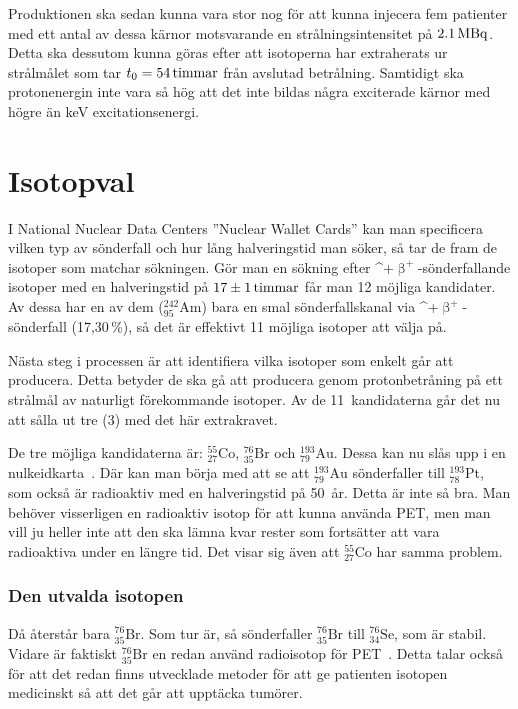 \documentclass[11pt,a4paper, german, english, swedish
]{article}
\newcommand{\BP}{\ifmmode\upbeta^{+}\else$\upbeta^{+}$\fi}
\begin{document}
Produktionen ska sedan kunna vara stor nog för att kunna injecera fem patienter med ett antal av dessa kärnor motsvarande en strålningsintensitet på $\unit[2.1]{MBq}$. Detta ska dessutom kunna göras efter att isotoperna har extraherats ur strålmålet som tar $t_0=\unit[54]{timmar}$ från avslutad betrålning. Samtidigt ska protonenergin inte vara så hög att det inte bildas några exciterade kärnor med högre än \unit[200]{keV} excitationsenergi. 



\section{Isotopval}
I National Nuclear Data Centers ''Nuclear Wallet Cards''\cite{NNDC_wallet} kan man specificera vilken typ av sönderfall och hur lång halveringstid man söker, så tar de fram de isotoper som matchar sökningen. Gör man en sökning efter \BP-sönderfallande isotoper med en halveringstid på $\unit[17\pm 1]{timmar}$ får man 12 möjliga kandidater. Av dessa har en av dem ($^{242}_{95}\!\mathrm{Am}$) bara en smal sönderfallskanal via \BP-sönderfall (17,30\,\%), så det är effektivt 11 möjliga isotoper att välja på.

Nästa steg i processen är att identifiera vilka isotoper som enkelt går att producera. Detta betyder de ska gå att producera genom protonbetråning på ett strålmål av naturligt förekommande isotoper\footnotemark{}. Av de 11~kandidaterna går det nu att sålla ut tre (3) med det här extrakravet. 

De tre möjliga kandidaterna är: $^{55}_{27}\mathrm{Co}$, $^{76}_{35}\mathrm{Br}$ och $^{193}_{79}\!\mathrm{Au}$. Dessa kan nu slås upp i en nulkeidkarta~\cite{NNDC_chart}. Där kan man börja med att se att $^{193}_{79}\!\mathrm{Au}$ sönderfaller till $^{193}_{78}\mathrm{Pt}$, som också är radioaktiv med en halveringstid på 50~år. Detta är inte så bra. Man behöver visserligen en radioaktiv isotop för att kunna använda PET, men man vill ju heller inte att den ska lämna kvar rester som fortsätter att vara radioaktiva under en längre tid. Det visar sig även att $^{55}_{27}\mathrm{Co}$ har samma problem.

\subsubsection*{Den utvalda isotopen}
Då återstår bara $^{76}_{35}\mathrm{Br}$. Som tur är, så sönderfaller $^{76}_{35}\mathrm{Br}$ till $^{76}_{34}\mathrm{Se}$, som är stabil. Vidare är faktiskt $^{76}_{35}\mathrm{Br}$ en redan använd radioisotop för PET~\cite{Lapi_PET,Valette_etal1993,Lovqvist_etal1997,Ribeiro_etal1999}. Detta talar också för att det redan finns utvecklade metoder för att ge patienten isotopen medicinskt så att det går att upptäcka tumörer. 
\end{document}
